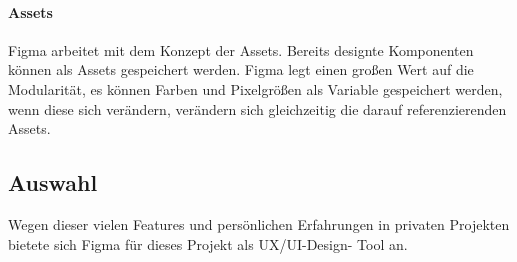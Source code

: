 \paragraph{Assets}
Figma arbeitet mit dem Konzept der Assets. Bereits designte Komponenten können als Assets gespeichert werden. Figma legt einen großen Wert auf die Modularität, es können Farben und Pixelgrößen als Variable gespeichert werden, wenn diese sich verändern, verändern sich gleichzeitig die darauf referenzierenden Assets.

\subsection{Auswahl}
Wegen dieser vielen Features und persönlichen Erfahrungen in privaten Projekten bietete sich Figma für dieses Projekt als UX/UI-Design- Tool an.